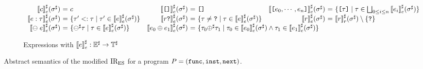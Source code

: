 \begin{figure}[t]
\begin{subfigure}[b]{\textwidth}
\[\begin{array}{r@{~}c@{~}lr@{~}c@{~}lr@{~}c@{~}l}
        \\

        \aseme{\const}(\aenv) &=& \const &

        \aseme{\clist{}}(\aenv) &=& \clist{} &

        \aseme{\clist{\expr_0, \cdots, \expr_n}}(\aenv)
        &=& \{ \clist{\ty} \mid \ty \in \bigjoin_{0 \leq i
        \leq n} \aseme{\expr_i}(\aenv) \}

        \\

        \aseme{\expr: \ty}(\aenv)
        &=& \{ \ty' \subtype \ty \mid \ty' \in
        \aseme{\expr}(\aenv) \} &

        \aseme{\refer \kwexists}(\aenv)
        &=& \{ \ty \neq \tabsent \mid \ty \in
        \aseme{\expr}(\aenv) \} &

        \aseme{\refer}(\aenv)
        &=& \asemr{\refer}(\aenv) \setminus \{ \tabsent \}

        \\

        \aseme{\uop \; \expr}(\aenv)
        &=& \{ \abs{\uop} \ty \mid \ty \in
        \aseme{\expr}(\aenv) \} &

        \aseme{\expr_0 \bop \expr_1}(\aenv)
        &=& \multicolumn{4}{@{}l}{\{ \ty_0 \abs{\bop} \ty_1 \mid \ty_0 \in
        \aseme{\expr_0}(\aenv) \wedge \ty_1 \in \aseme{\expr_1}(\aenv) \}}

        \\
      \end{array}
    \]
    \caption{Expressions with ${\llbracket{e}\rrbracket}^\sharp_e: {\mathbb{E}}^\sharp \rightarrow \mathbb{T}^\sharp$}
  \end{subfigure}
  \caption{Abstract semantics of the modified ${\text{IR}_\text{ES}}$ for a program $P =
  (\mathtt{func}, \mathtt{inst}, \mathtt{next})$.}
  \vspace*{-1.5em}
  \label{fig:abs-sem}
\end{figure}

